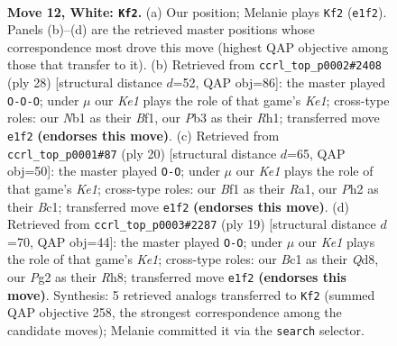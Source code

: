 \documentclass[11pt]{article}
\begin{document}
\clearpage

\begin{figure}[p]\centering
\begin{subfigure}{0.46\textwidth}\centering
\resizebox{\linewidth}{!}{%
\newchessgame
\chessboard[
  setfen={r1b1kbnr/p1p1q1p1/8/3pPp1p/5P2/1P6/P3Q1PP/RNB1KB1R w KQkq - 0 12},
  showmover=false,
  pgfstyle=straightmove, color=movearrow, markmove={e1-f2}
]}
\caption{}
\end{subfigure}\hfill
\begin{subfigure}{0.46\textwidth}\centering
\resizebox{\linewidth}{!}{%
\newchessgame
\chessboard[
  setfen={r3kb1r/ppp1qpp1/8/4Pb1p/2P5/4Q2P/PP1N1PP1/R3KB1R w KQkq - 1 15},
  showmover=false,
  pgfstyle=straightmove, color=movearrow, markmove={e1-c1}
]}
\caption{}
\end{subfigure}
\\[4pt]
\begin{subfigure}{0.46\textwidth}\centering
\resizebox{\linewidth}{!}{%
\newchessgame
\chessboard[
  setfen={r1b1k2r/ppp1bppp/3qp3/8/2B5/2P5/PPP1QPPP/R1B1K2R w KQkq - 3 11},
  showmover=false,
  pgfstyle=straightmove, color=movearrow, markmove={e1-g1}
]}
\caption{}
\end{subfigure}\hfill
\begin{subfigure}{0.46\textwidth}\centering
\resizebox{\linewidth}{!}{%
\newchessgame
\chessboard[
  setfen={rnbqk2r/ppp2pbp/3p4/8/3P1BpP/2PN4/P1P3P1/R2QKB1R b KQkq - 0 10},
  showmover=false,
  pgfstyle=straightmove, color=movearrow, markmove={e8-g8}
]}
\caption{}
\end{subfigure}
\caption{\textbf{Move 12, White: \texttt{Kf2}.} (a) Our position; Melanie plays \texttt{Kf2} (\texttt{e1f2}). Panels (b)--(d) are the retrieved master positions whose correspondence most drove this move (highest QAP objective among those that transfer to it). (b) Retrieved from \texttt{ccrl\_top\_p0002\#2408} (ply 28) [structural distance $d$=52, QAP obj=86]: the master played \texttt{O-O-O}; under $\mu$ our \emph{Ke1} plays the role of that game's \emph{Ke1}; cross-type roles: our \emph{N}b1 as their \emph{B}f1, our \emph{P}b3 as their \emph{R}h1; transferred move \texttt{e1f2} \textbf{(endorses this move)}. (c) Retrieved from \texttt{ccrl\_top\_p0001\#87} (ply 20) [structural distance $d$=65, QAP obj=50]: the master played \texttt{O-O}; under $\mu$ our \emph{Ke1} plays the role of that game's \emph{Ke1}; cross-type roles: our \emph{B}f1 as their \emph{R}a1, our \emph{P}h2 as their \emph{B}c1; transferred move \texttt{e1f2} \textbf{(endorses this move)}. (d) Retrieved from \texttt{ccrl\_top\_p0003\#2287} (ply 19) [structural distance $d$=70, QAP obj=44]: the master played \texttt{O-O}; under $\mu$ our \emph{Ke1} plays the role of that game's \emph{Ke1}; cross-type roles: our \emph{B}c1 as their \emph{Q}d8, our \emph{P}g2 as their \emph{R}h8; transferred move \texttt{e1f2} \textbf{(endorses this move)}. Synthesis: 5 retrieved analogs transferred to \texttt{Kf2} (summed QAP objective 258, the strongest correspondence among the candidate moves); Melanie committed it via the \texttt{search} selector.}
\label{fig:thought-m22}
\end{figure}
\end{document}
